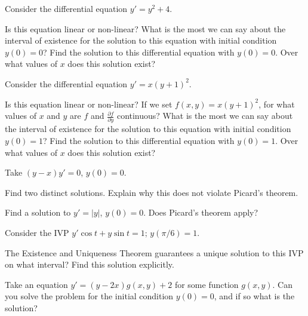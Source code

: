 \begin{exercise}
Consider the differential equation $y' = y^2 + 4$. 
\begin{tasks}
\task Is this equation linear or non-linear?
\task What is the most we can say about the interval of existence for the solution to this equation with initial condition $y(0) = 0$?
\task Find the solution to this differential equation with $y(0) = 0$. Over what values of $x$ does this solution exist?
\end{tasks}
\end{exercise}

\begin{exercise}
Consider the differential equation $y' = x(y+1)^2$. 
\begin{tasks}
\task Is this equation linear or non-linear?
\task If we set $f(x,y) = x(y+1)^2$, for what values of $x$ and $y$ are $f$ and $\frac{\partial f}{\partial y}$ continuous?
\task What is the most we can say about the interval of existence for the solution to this equation with initial condition $y(0) = 1$?
\task Find the solution to this differential equation with $y(0) = 1$. Over what values of $x$ does this solution exist?
\end{tasks}
\end{exercise}

\begin{exercise}[challenging]
Take $(y-x)y' = 0$, $y(0) = 0$.
\begin{tasks}
\task Find two distinct solutions.
\task Explain why this does not violate Picard's theorem.  
\end{tasks}
\end{exercise}

\begin{exercise}
Find a solution to $y' = \lvert y \rvert$, $y(0) = 0$.  Does Picard's theorem apply?
\end{exercise}

\begin{exercise}
Consider the IVP $y'\cos t+y\sin t=1; \, y(\pi/6)=1$.%
\begin{tasks}
\task The Existence and Uniqueness Theorem guarantees a unique solution to this IVP on what interval?
\task Find this solution explicitly.
\end{tasks}
\end{exercise}

\begin{exercise}
Take an equation $y' = (y-2x) g(x,y) + 2$ for some function $g(x,y)$.
Can you solve the problem for the
initial condition $y(0) = 0$,
and if so what is the solution?
\end{exercise}

